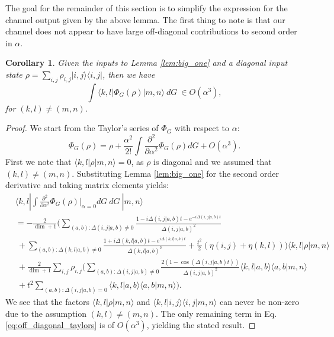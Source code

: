 \documentclass{article}
\newtheorem{corollary}[theorem]{Corollary}
\newcommand{\ket}[1]{|#1\rangle}
\newcommand{\bra}[1]{\langle #1|}
\newcommand{\braket}[2]{\langle #1|#2\rangle}
\newcommand{\ketbra}[2]{| #1\rangle\! \langle #2|}
\newcommand{\bigo}[1]{O\left( #1 \right)}
\begin{document}
The goal for the remainder of this section is to simplify the expression for the channel output given by the above lemma. The first thing to note is that our channel does not appear to have large off-diagonal contributions to second order in $\alpha$. 
\begin{corollary}
    Given the inputs to Lemma \ref{lem:big_one} and a diagonal input state $\rho = \sum_{i,j} \rho_{i,j} \ketbra{i,j}{i,j}$, then we have $$\int \bra{k,l} \Phi_G(\rho)  \ket{m,n} ~dG~ \in \bigo{\alpha^3},$$ for $(k,l) \neq (m,n)$.
\end{corollary}
\begin{proof}
    We start from the Taylor's series of $\Phi_G$ with respect to $\alpha$:
    \begin{equation}
        \Phi_G(\rho) = \rho + \frac{\alpha^2}{2!} \int \frac{\partial^2}{\partial \alpha^2} \Phi_G(\rho) dG + \bigo{\alpha^3}. \label{eq:off_diagonal_taylors}
    \end{equation}
    First we note that $\bra{k,l}\rho \ket{m,n} =0$, as $\rho$ is diagonal and we assumed that $(k,l) \neq (m,n)$. Substituting Lemma \ref{lem:big_one} for the second order derivative and taking matrix elements yields:
    \begin{align}
        &\bra{k,l} \int \frac{\partial^2}{\partial \alpha^2} \Phi_G(\rho)\bigg|_{\alpha = 0} dG ~dG ~\ket{m,n}  \\
     &= -\frac{2 }{\dim + 1} \bigg(\sum_{(a,b): \Delta(i,j|a,b) \neq 0} \frac{1 - i \Delta(i,j|a,b)t - e^{-i \Delta(i,j|a,b) t}}{\Delta(i,j|a,b)^2} \nonumber \\
     &~+ \sum_{(a,b): \Delta(k,l|a,b) \neq 0} \frac{1 + i \Delta(k,l|a,b) t - e^{i \Delta(k,l|a,b) t}}{\Delta(k,l|a,b)^2} + \frac{t^2}{2}(\eta(i,j) + \eta(k,l)) \bigg) \bra{k,l} \rho \ket{m,n} \nonumber \\
    &~ + \frac{2}{\dim+1}\sum_{i,j} \rho_{i,j} \bigg(\sum_{(a,b): \Delta(i,j|a,b) \neq 0 } \frac{2(1- \cos (\Delta(i,j|a,b)t))}{\Delta(i,j|a,b)^2} \braket{k,l}{a,b} \braket{a,b}{m,n} \nonumber \\
    &~ + t^2 \sum_{(a,b) : \Delta(i,j|a,b) = 0} \braket{k,l}{a,b} \braket{a,b}{m,n} \bigg).
    \end{align}
    We see that the factors $\bra{k,l}\rho \ket{m,n}$ and $\braket{k,l}{i,j} \braket{i,j}{m,n}$ can never be non-zero due to the assumption $(k,l) \neq (m,n)$. The only remaining term in Eq. \ref{eq:off_diagonal_taylors} is of $\bigo{\alpha^3}$, yielding the stated result.
\end{proof}
\end{document}

